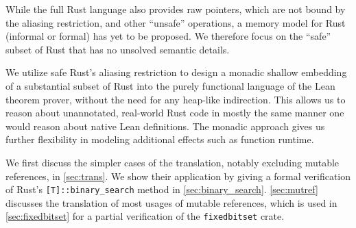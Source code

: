 While the full Rust language also provides raw pointers, which are not bound by
the aliasing restriction, and other ``unsafe'' operations, a
memory model for Rust (informal or formal) has yet to be proposed. We therefore focus on the ``safe''
subset of Rust that has no unsolved semantic details.

We utilize safe Rust's aliasing restriction to design a monadic shallow embedding of a
substantial subset of Rust
into the purely functional language of the Lean~\cite{de2015lean} theorem prover, without the need
for any heap-like indirection. This allows us to
reason about unannotated, real-world Rust code in mostly the same manner one would
reason about native Lean definitions. The monadic approach gives us further
flexibility in modeling additional effects such as function runtime.

We first discuss the simpler cases of the
translation, notably excluding mutable references, in \autoref{sec:trans}. We
show their application by giving a formal verification of Rust's
\verb![T]::binary_search! method in \autoref{sec:binary_search}.
\autoref{sec:mutref} discusses the translation of most usages of mutable
references, which is used in \autoref{sec:fixedbitset} for a partial verification of the
\texttt{fixedbitset} crate.